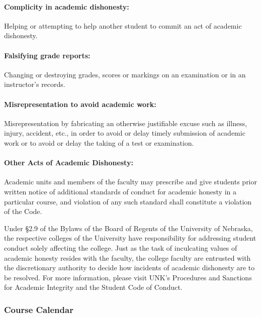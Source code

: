 \documentclass[12pt,fullpage]{article}
\newcounter{ex}\setcounter{ex}{0}
\begin{document}
\paragraph{Complicity in academic dishonesty:} Helping or attempting to help another student to commit an act of
academic dishonesty.

\paragraph{Falsifying grade reports:} Changing or destroying grades, scores or markings on an examination or in an
instructor's records.

\paragraph{Misrepresentation to avoid academic work:} Misrepresentation by fabricating an otherwise justifiable excuse
such as illness, injury, accident, etc., in order to avoid or delay timely submission of academic work or to
avoid or delay the taking of a test or examination.

\paragraph{Other Acts of Academic Dishonesty:} Academic units and members of the faculty may prescribe and give
students prior written notice of additional standards of conduct for academic honesty in a particular course,
and violation of any such standard shall constitute a violation of the Code.

Under \S 2.9 of the Bylaws of the Board of Regents of the University of Nebraska, the respective colleges
of the University have responsibility for addressing student conduct solely affecting the college. Just as the
task of inculcating values of academic honesty resides with the faculty, the college faculty are entrusted with
the discretionary authority to decide how incidents of academic dishonesty are to be resolved. For more
information, please visit UNK's Procedures and Sanctions for Academic Integrity and the Student Code of
Conduct.












\newpage

\subsubsection*{Course Calendar}
\end{document}
